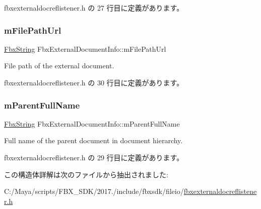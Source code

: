  fbxexternaldocreflistener.\+h の 27 行目に定義があります。

\mbox{\label{struct_fbx_external_document_info_a65b555c9b2dc44bc63d65b3ae2c24cac}} 
\subsubsection{\texorpdfstring{m\+File\+Path\+Url}{mFilePathUrl}}
{\footnotesize\ttfamily \hyperlink{class_fbx_string}{Fbx\+String} Fbx\+External\+Document\+Info\+::m\+File\+Path\+Url}



File path of the external document. 



 fbxexternaldocreflistener.\+h の 30 行目に定義があります。

\mbox{\label{struct_fbx_external_document_info_ae677004de679e0106dcfea163f36079c}} 
\subsubsection{\texorpdfstring{m\+Parent\+Full\+Name}{mParentFullName}}
{\footnotesize\ttfamily \hyperlink{class_fbx_string}{Fbx\+String} Fbx\+External\+Document\+Info\+::m\+Parent\+Full\+Name}



Full name of the parent document in document hierarchy. 



 fbxexternaldocreflistener.\+h の 29 行目に定義があります。



この構造体詳解は次のファイルから抽出されました\+:\begin{DoxyCompactItemize}
\item 
C\+:/\+Maya/scripts/\+F\+B\+X\+\_\+\+S\+D\+K/2017./include/fbxsdk/fileio/\hyperlink{fbxexternaldocreflistener_8h}{fbxexternaldocreflistener.\+h}\end{DoxyCompactItemize}
